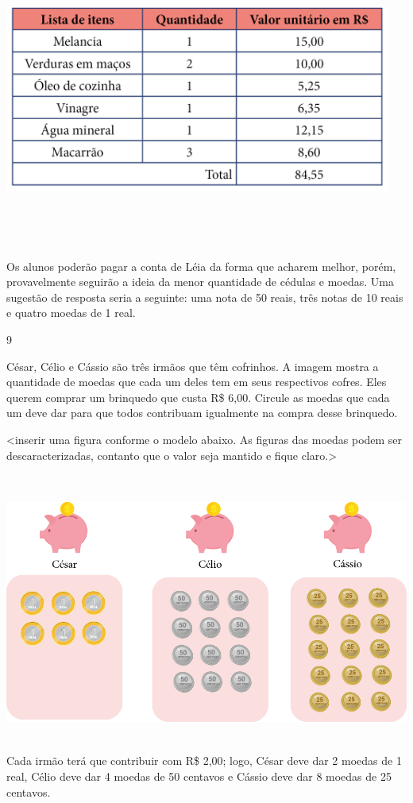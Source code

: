 {{{{{{{{{\includegraphics[width=5.00000in,height=3.80208in]{media/image75.png}

Os alunos poderão pagar a conta de Léia da forma que
acharem melhor, porém, provavelmente seguirão a ideia da menor
quantidade de cédulas e moedas. Uma sugestão de resposta seria a seguinte: uma nota de 50 reais, três notas de 10 reais e quatro moedas de 1 real.

\num{9}

César, Célio e Cássio são três irmãos que têm cofrinhos. A
imagem mostra a quantidade de moedas que cada um deles tem em
seus respectivos cofres. Eles querem comprar um brinquedo que custa R\$ 6,00.
Circule as moedas que cada um deve dar para que todos contribuam
igualmente na compra desse brinquedo.

\textless{}inserir uma figura conforme o modelo abaixo. As figuras das
moedas podem ser descaracterizadas, contanto que o valor seja mantido e
fique claro.\textgreater{}

\includegraphics[width=6.14583in,height=3.61068in]{media/image76.png}
Cada irmão terá que contribuir com R\$ 2,00; logo, César deve dar 2
moedas de 1 real, Célio deve dar 4 moedas de 50 centavos e Cássio deve dar 8 moedas de 25 centavos.

}}}}}}}}}
